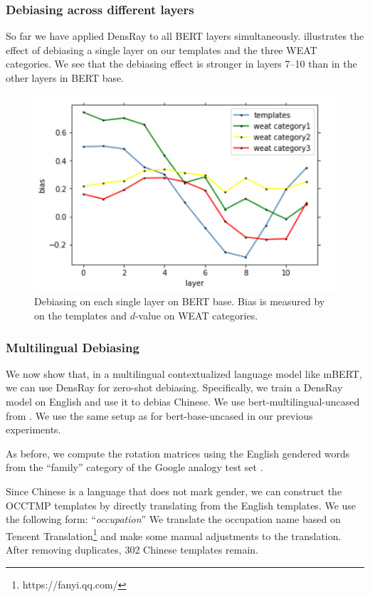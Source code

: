 \subsubsection{Debiasing across different layers}
So far we have applied DensRay to all BERT layers simultaneously.
    illustrates the effect of
 debiasing a single  layer on our templates and the three
 WEAT categories. We see that the debiasing effect
is stronger in
layers 7--10  than in the other layers in BERT base.
\begin{figure}[h]
	\centering
	\includegraphics[width=0.5\linewidth]{layers_base}
	\caption{Debiasing on each single layer on BERT base. Bias is measured by  on the templates and $d$-value on WEAT categories.}
\end{figure}

\subsubsection{Multilingual Debiasing}
We now show that, in a multilingual contextualized language
model like mBERT,
we can use DensRay  for zero-shot debiasing.
Specifically, we train a DensRay model on English and use it
to debias Chinese.
We use  bert-multilingual-uncased from
. We  use the same setup as
for bert-base-uncased in our previous experiments. 

As before, we compute the rotation matrices using the English gendered words from the ``family'' category of the Google analogy test set .

Since Chinese is a language that does not mark gender, we
can construct the OCCTMP templates by directly translating
from the English templates. We use the following form:
``\text{[MASK]}\textit{occupation}''
We translate the occupation name based on
Tencent
Translation\footnote{https://fanyi.qq.com/} and make some
manual adjustments to the translation. After removing 
duplicates,  302 Chinese templates remain.

